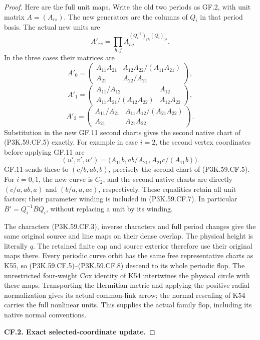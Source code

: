 \begin{proof}
Here are the full unit maps. Write the old two periods as GF.2,
with unit matrix \(A=(A_{rs})\). The new generators are the
columns of \(Q_i\) in that period basis. The actual new units are
\[
 A'_{rs}=\prod_{h,j}A_{hj}^{(Q_i^{-1})_{rh}(Q_i)_{js}}. \tag{P3K.59.CF.7}
\]
In the three cases their matrices are
\[
 A'_0=\begin{pmatrix}
 A_{11}A_{21}&A_{12}A_{22}/(A_{11}A_{21})\\
 A_{21}&A_{22}/A_{21}
 \end{pmatrix},
\]
\[
 A'_1=\begin{pmatrix}
 A_{11}/A_{12}&A_{12}\\
 A_{11}A_{21}/(A_{12}A_{22})&A_{12}A_{22}
 \end{pmatrix},
\]
\[
 A'_2=\begin{pmatrix}
 A_{11}/A_{21}&A_{11}A_{12}/(A_{21}A_{22})\\
 A_{21}&A_{21}A_{22}
 \end{pmatrix}.                                      \tag{P3K.59.CF.8}
\]
Substitution in the new GF.11 second charts gives the second
native chart of (P3K.59.CF.5) exactly. For example in case \(i=2\),
the second vertex coordinates before applying GF.11 are
\[
 (u',v',w')=\bigl(A_{11}b,ab/A_{21},A_{21}c/(A_{11}b)\bigr).
\]
GF.11 sends these to \((c/b,ab,b)\), precisely the second
chart of (P3K.59.CF.5). For \(i=0,1\), the new curve is \(C_2\),
and the second native charts are directly
\((c/a,ab,a)\) and \((b/a,a,ac)\), respectively.
These equalities retain all unit factors; their parameter winding
is included in (P3K.59.CF.7). In particular
\(B'=Q_i^{-1}BQ_i\), without replacing a unit by its winding.

The characters (P3K.59.CF.3), inverse characters and full period changes
give the same original source and line maps on their dense overlap.
The physical height is literally \(q\). The retained finite cap
and source exterior therefore use their original maps there.
Every periodic curve orbit has the same free representative charts
as K55, so (P3K.59.CF.5)--\allowbreak (P3K.59.CF.8) descend to its whole periodic flop.
The unrestricted four-weight Cox identity of K54 intertwines
the physical circle with these maps. Transporting the Hermitian
metric and applying the positive radial normalization gives its
actual common-link arrow; the normal rescaling of K54 carries
the full nonlinear units. This supplies the actual family flop,
including its native normal conventions.

\par\medskip\noindent\textbf{CF.2. Exact selected-coordinate update.}\par\nopagebreak[4]


\end{proof}
